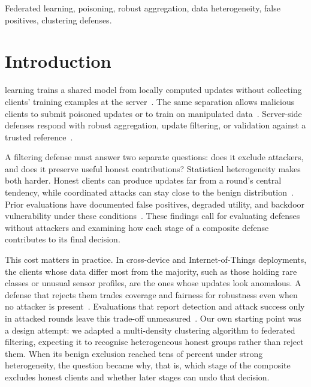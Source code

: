 \documentclass[journal]{IEEEtran}
\begin{document}
\begin{IEEEkeywords}
Federated learning, poisoning, robust aggregation, data heterogeneity, false positives, clustering defenses.
\end{IEEEkeywords}
\IEEEpeerreviewmaketitle

\section{Introduction}
 learning trains a shared model from locally computed updates without collecting clients' training examples at the server~\cite{mcmahan2017}. The same separation allows malicious clients to submit poisoned updates or to train on manipulated data~\cite{fang2020,bagdasaryan2020,xie2020dba}. Server-side defenses respond with robust aggregation, update filtering, or validation against a trusted reference~\cite{blanchard2017,yin2018,cao2021fltrust,nguyen2022flame}.

A filtering defense must answer two separate questions: does it exclude attackers, and does it preserve useful honest contributions? Statistical heterogeneity makes both harder. Honest clients can produce updates far from a round's central tendency, while coordinated attacks can stay close to the benign distribution~\cite{baruch2019,shejwalkar2021}. Prior evaluations have documented false positives, degraded utility, and backdoor vulnerability under these conditions~\cite{singh2023fair,ye2025illusion,bellachia2026sok}. These findings call for evaluating defenses without attackers and examining how each stage of a composite defense contributes to its final decision.

This cost matters in practice. In cross-device and Internet-of-Things deployments, the clients whose data differ most from the majority, such as those holding rare classes or unusual sensor profiles, are the ones whose updates look anomalous. A defense that rejects them trades coverage and fairness for robustness even when no attacker is present~\cite{singh2023fair,touat2023bias,ajibuwa2025fairness}. Evaluations that report detection and attack success only in attacked rounds leave this trade-off unmeasured~\cite{djemaa2026heterogeneity}. Our own starting point was a design attempt: we adapted a multi-density clustering algorithm to federated filtering, expecting it to recognise heterogeneous honest groups rather than reject them. When its benign exclusion reached tens of percent under strong heterogeneity, the question became why, that is, which stage of the composite excludes honest clients and whether later stages can undo that decision.
\end{document}
